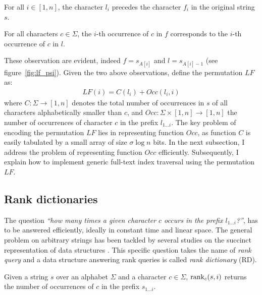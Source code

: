 \begin{observation}
\label{obs:lf-a}
\citep{Burrows1994}
For all $i \in [1,n]$, the character $l_i$ precedes the character $f_i$ in the original string $s$.%
\end{observation}
\begin{observation}
\label{obs:lf-b}
\citep{Burrows1994}
For all characters $c \in \Sigma$, the $i$-th occurrence of $c$ in $f$ corresponds to the $i$-th occurrence of $c$ in $l$.
\end{observation}

These observation are evident, indeed $f = s_{A[i]}$ and $l = s_{A[i] - 1}$ (see figure~\ref{fig:lf_psi}).
Given the two above observations, \citeauthor{Ferragina2000} define the permutation $LF$ as:
\begin{eqnarray}
LF(i) = C(l_i) + Occ(l_i, i)
\end{eqnarray}
where $C : \Sigma \rightarrow [1,n]$ denotes the total number of occurrences in $s$ of all characters alphabetically smaller than $c$, and $Occ :  \Sigma \times [1,n] \rightarrow [1,n]$ the number of occurrences of character $c$ in the prefix $l_{1 \dots i}$.
The key problem of encoding the permutation $LF$ lies in representing function $Occ$, as function $C$ is easily tabulated by a small array of size $\sigma \log{n}$ bits.
In the next subsection, I address the problem of representing function $Occ$ efficiently. Subsequently, I explain how to implement generic full-text index traversal using the permutation $LF$.

\subsection{Rank dictionaries}
\label{sec:index:succinct:rd}

The question \emph{``how many times a given character $c$ occurs in the prefix $l_{1 \dots i}$?''}, has to be answered efficiently, ideally in constant time and linear space.
The general problem on arbitrary strings has been tackled by several studies on the succinct representation of data structures \citep{Jacobson1989}.
This specific question takes the name of \emph{rank query} and a data structure answering rank queries is called \emph{rank dictionary} (RD).

\begin{definition}
Given a string $s$ over an alphabet $\Sigma$ and a character $c \in \Sigma$, $\text{rank}_c(s, i)$ returns the number of occurrences of $c$ in the prefix $s_{1 \dots i}$.
\end{definition}

